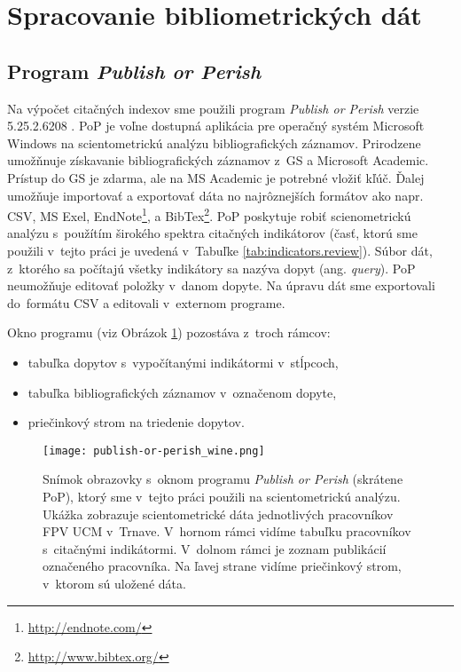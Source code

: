 \section{Spracovanie bibliometrických dát}

\subsection{Program \emph{Publish or Perish}}
\label{sec:pop}

Na výpočet citačných indexov sme použili program \emph{Publish or Perish} verzie
5.25.2.6208 \citep{Harzing2011}.  PoP je voľne dostupná aplikácia pre operačný
systém Microsoft Windows na scientometrickú analýzu bibliografických záznamov.
Prirodzene umožňnuje získavanie bibliografických záznamov z~GS a Microsoft
Academic. Prístup do GS je zdarma, ale na MS Academic je potrebné vložiť kľúč.
Ďalej umožňuje importovať a exportovať dáta no najrôznejších formátov ako napr.
CSV, MS Exel, EndNote\footnote{\url{http://endnote.com/}}, a
BibTex\footnote{\url{http://www.bibtex.org/}}.  PoP poskytuje robiť scienometrickú
analýzu s~použítím širokého spektra citačných indikátorov (časť, ktorú sme použili
v~tejto práci je uvedená v~Tabuľke \ref{tab:indicators.review}).
Súbor dát, z~ktorého sa počítajú všetky indikátory sa nazýva dopyt (ang. \emph{query}).
PoP neumožňuje editovať položky v~danom dopyte. Na úpravu dát sme exportovali
do~formátu CSV a editovali v~externom programe.

Okno programu (viz Obrázok
\ref{fig:pop.screenshot}) pozostáva z~troch rámcov: 
\begin{itemize}
  \item tabuľka dopytov s~vypočítanými indikátormi v~stĺpcoch, 
  \item tabuľka bibliografických záznamov v~označenom dopyte,
  \item priečinkový strom na triedenie dopytov.
\end{itemize}

\begin{figure}
  \centering
  \texttt{[image: publish-or-perish\_wine.png]}
  \caption[Snímok obrazovky s~oknom programu \emph{Publish or Perish}.]
  {Snímok obrazovky s~oknom programu \emph{Publish or Perish} (skrátene PoP),
  ktorý sme v~tejto práci použili na scientometrickú analýzu.  Ukážka zobrazuje
  scientometrické dáta jednotlivých pracovníkov FPV UCM v~Trnave. V~hornom
  rámci vidíme tabuľku pracovníkov s~citačnými indikátormi. V~dolnom rámci je
  zoznam publikácií označeného pracovníka. Na ľavej strane vidíme priečinkový
  strom, v~ktorom sú uložené dáta.}
  \label{fig:pop.screenshot}
\end{figure}


